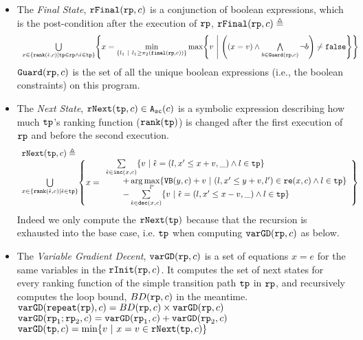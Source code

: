 \begin{defn}
\begin{itemize}
 \item  The \emph{Final State}, $\mathtt{rFinal}(\mathtt{rp}, c)$ is a conjunction of boolean expressions, which is the post-condition
 after the execution of $\mathtt{rp}$, $\mathtt{rFinal}(\mathtt{rp}, c) \triangleq $
 {\small
\[
  \begin{array}{l} 
   \bigcup\limits_{x \in \left\{ \locbound(\absevent, c) | \tpath \in \rprog \land \absevent \in \tpath \right\} }
   \left \{ 
   x = \min\limits_{ \left\{ l_1 ~|~ l_1 \geq \pi_2(\absfinal(\rprog, c)) \right\} }
   \max\left\{
     v ~\middle\vert~ 
     \left( (x = v) \land \bigwedge\limits_{b \in \kw{Guard}(\rprog, c)} \neg b \right) \neq \efalse
   \right\}
   \right\}
  \end{array}
  \]
    }
    $\mathtt{Guard}(\mathtt{rp}, c)$ is the set of all the unique boolean expressions (i.e., the boolean constraints) on this program.
 \item The \emph{Next State}, $\mathtt{rNext}(\mathtt{tp}, c) \in {\ensuremath{\mathtt{A_{sc}}}}(c)$ 
 is a
 symbolic expression describing how much $\mathtt{tp}$'s ranking function ($\mathtt{rank}(\mathtt{tp})$) is changed after the first execution of $\mathtt{rp}$ and before the second execution.
 {\small
 \[
   \begin{array}{l}
   \rfnext(\tpath, c) \triangleq 
   \\
   \bigcup\limits_{x \in \left\{ \locbound(\absevent, c) | \absevent \in \tpath \right\}}
   \left\{ x = \begin{array}{l}
  \sum\limits_{\absevent \in \inc(x, c) }
   \left\{ v ~\middle\vert~ \absevent = (l, x' \leq x + v, \_) \land l \in \tpath\right\}
   \\ \qquad 
   + \arg\max\limits_{l' }
      \left\{ \varinvar(y, c) + v ~\middle\vert~ (l, x' \leq y + v, l') \in \reset(x, c) \land l \in \tpath\right\}
      \\ \qquad 
     - \sum\limits_{ \absevent \in \dec(x, c) }\left\{ 
       v ~\middle\vert~ \absevent = (l, x' \leq x - v, \_) \land l \in \tpath 
       \right\}
     \end{array}
   \right\} 
   \end{array}
 \]
  }
   Indeed we only compute the $\mathtt{rNext}(\mathtt{tp})$ because that the recursion is exhausted into the base case, i.e. $\mathtt{tp}$ when computing $\mathtt{varGD}(\mathtt{rp}, c)$ as below.
 \item  The \emph{Variable Gradient Decent}, 
 $\mathtt{varGD}(\mathtt{rp}, c)$
 is a set of equations $x = e$ for the same variables in the $\mathtt{rInit}(\mathtt{rp}, c)$.
 It computes the set of next states for every ranking function of the simple transition path $\mathtt{tp}$ in $\mathtt{rp}$,
 and recursively computes the loop bound, $BD(\mathtt{rp}, c)$ in the meantime.
 \\
 {$\mathtt{varGD}(\mathtt{repeat}(\mathtt{rp}), c) =  BD(\mathtt{rp}, c)  \times
{\ensuremath{\mathtt{varGD}}(\ensuremath{\mathtt{rp}}, c)}$}
 \\
 $\mathtt{varGD}(\mathtt{rp}_1;\mathtt{rp}_2, c) =  \mathtt{varGD}(\mathtt{rp}_1, c) + \mathtt{varGD}(\mathtt{rp}_2, c)$
 \\
 $\varGD(\tpath, c) =  \min\left\{v  ~|~ x = v \in \rfnext(\tpath, c) \right\}  $  
\end{itemize}
\end{defn}
